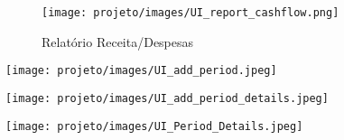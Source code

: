 \documentclass[12pt]{article}
\begin{document}
\begin{appendices}
\begin{figure}[!ht]
  \centering
  \texttt{[image: projeto/images/UI\_report\_cashflow.png]}
  \caption{Relatório Receita/Despesas}
  \label{fig:UI_report_cashflow}
\end{figure}

\begin{table*}[!ht]
    \begin{minipage}{.4\linewidth}
        \centering
        \texttt{[image: projeto/images/UI\_add\_period.jpeg]}
        \label{fig:UI_add_period}
    \end{minipage}
    \hfill
    \begin{minipage}{.4\linewidth}
        \centering
        \texttt{[image: projeto/images/UI\_add\_period\_details.jpeg]}
        \label{fig:UI_add_period_details}
    \end{minipage}
\end{table*}

\begin{table*}[!ht]
    \begin{minipage}{.4\linewidth}
        \centering
        \texttt{[image: projeto/images/UI\_Period\_Details.jpeg]}
        \label{fig:UI_Period_Details}
    \end{minipage}
\end{table*}

\end{appendices}
\end{document}
